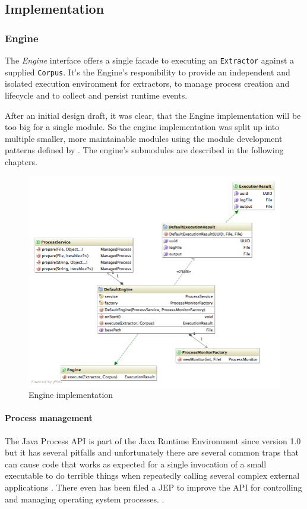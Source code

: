 \subsection{Implementation}
\label{sec:implementation}

\subsubsection{Engine}
The \textit{Engine} interface offers a single facade to executing an \texttt{Extractor} against a supplied \texttt{Corpus}. It's the Engine's responibility to provide an independent and isolated execution environment for extractors, to manage process creation and lifecycle and to collect and persist runtime events.

After an initial design draft, it was clear, that the Engine implementation will be too big for a single module. So the engine implementation was split up into multiple smaller, more maintainable modules using the module development patterns defined by \citeauthor{Knoernschild:2012}\cite{Knoernschild:2012}. The engine's submodules are described in the following chapters.

\begin{figure}[H]
\centering
\includegraphics[width=\textwidth]{execution.png}
\caption{Engine implementation}
\end{figure}

\newpage
\paragraph{Process management}
The Java Process API is part of the Java Runtime Environment since version 1.0 but it has several  pitfalls and unfortunately there are several common traps that can cause code that works as expected for a single invocation of a small executable to do terrible things when repeatedly calling several complex external applications \cite{Cartmell:2009}. There even has been filed a \gls{JEP} to improve the API for controlling and managing operating system processes. \cite{JEP:102}.

